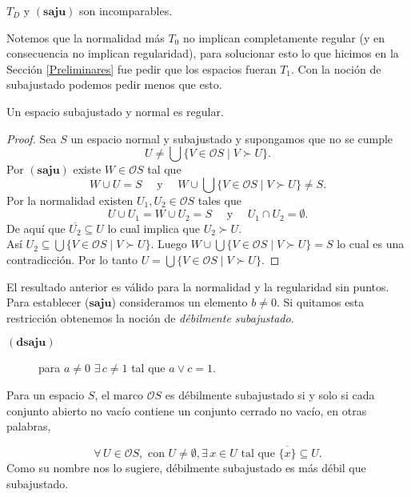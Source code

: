 \documentclass{comunicaciones}
\begin{document}
\begin{cor}
    $T_D$ y $(\mathbf{saju})$ son incomparables.
\end{cor}

Notemos que la normalidad más $T_0$ no implican completamente regular (y en consecuencia no implican regularidad), para solucionar esto lo que hicimos en la Sección \ref{Preliminares} fue pedir que los espacios fueran $T_1$. Con la noción de subajustado podemos pedir menos que esto.

\begin{prop}
    Un espacio subajustado y normal es regular.
\end{prop}

\begin{proof}
    Sea $S$ un espacio normal y subajustado y supongamos que no se cumple 
    \[
    U\neq \bigcup\{V\in \mathcal{O}S\mid V\succ U\}.
    \]
    Por $(\mathbf{saju})$ existe $W\in\mathcal{O}S$ tal que 
    \[
    W\cup U=S\quad\mbox{ y }\quad W\cup \bigcup\{V\in \mathcal{O}S\mid V\succ U\}\neq S.
    \]
    Por la normalidad existen $U_1, U_2\in \mathcal{O}S$ tales que 
    \[
    U\cup U_1=W\cup U_2=S\quad\mbox{ y }\quad U_1\cap U_2=\emptyset.
    \]
    De aquí que $\overline{U_2}\subseteq U$ lo cual implica que $U_2\succ U$. \\
    
    \noindent
    Así $U_2\subseteq\bigcup\{V\in \mathcal{O}S\mid V\succ U\}$. Luego $W\cup\bigcup\{V\in \mathcal{O}S\mid V\succ U\}=S$ lo cual es una contradicción. Por lo tanto $U=\bigcup\{V\in \mathcal{O}S\mid V\succ U\}$.
    \end{proof}
    
El resultado anterior es válido para la normalidad y la regularidad sin puntos.\\

Para establecer ($\textbf{saju}$) consideramos un elemento $b\neq 0$. Si quitamos esta restricción obtenemos la noción de \emph{débilmente subajustado}.

\begin{description}
    \item[$(\textbf{dsaju})$] para $a\neq 0$ $\exists\, c\neq 1$ tal que $a\vee c=1$.
\end{description}

Para un espacio $S$, el marco $\mathcal{O}S$ es débilmente subajustado si y solo si cada conjunto abierto no vacío contiene un conjunto cerrado no vacío, en otras palabras,

\[
\forall\, U\in \mathcal{O}S, \mbox{ con } U\neq \emptyset, \exists\, x\in U \mbox{ tal que } \overline{\{x\}}\subseteq U.
\]
Como su nombre nos lo sugiere, débilmente subajustado es más débil que subajustado.
\end{document}
